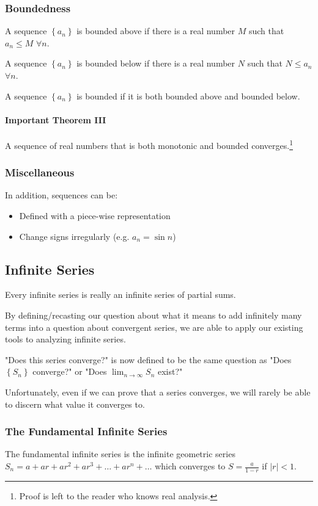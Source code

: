 \documentclass{article}
\begin{document}
\subsubsection{Boundedness} \label{monoton}
A sequence $\left\{ a_n \right\}$ is bounded above if there is a real number $M$ such that $a_n \le M$ $\forall n$.

A sequence $\left\{ a_n \right\}$ is bounded below if there is a real number $N$ such that $N \le a_n$ $\forall n$.

A sequence $\left\{ a_n \right\}$ is bounded if it is both bounded above and bounded below.

\paragraph{Important Theorem III}
A sequence of real numbers that is both monotonic and bounded converges.\footnote{Proof is left to the reader who knows real analysis.}

\subsubsection{Miscellaneous}
In addition, sequences can be:
\begin{itemize}
    \item Defined with a piece-wise representation
    \item Change signs irregularly (e.g. $a_n = \sin{n}$)
\end{itemize}

\subsection{Infinite Series}
Every infinite series is really an infinite series of partial sums.

By defining/recasting our question about what it means to add infinitely many terms into a question about convergent series, we are able to apply our existing tools to analyzing infinite series.

"Does this series converge?" is now defined to be the same question as "Does $\left\{ S_n \right\}$ converge?" or "Does $\lim_{n \to \infty} S_n$ exist?"

Unfortunately, even if we can prove that a series converges, we will rarely be able to discern what value it converges to.

\subsubsection{The Fundamental Infinite Series}
The fundamental infinite series is the infinite geometric series
$S_n = a + ar + ar^2 + ar^3 + \ldots + ar^n + \ldots$
which converges to $S = \frac{a}{1-r}$ if $|r| < 1$.
\end{document}
